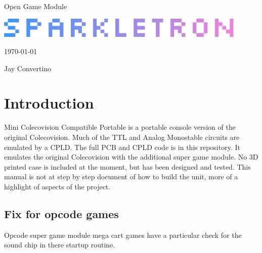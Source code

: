 \begin{titlepage}
  \begin{center}

  {\Huge Open Game Module}

  \vspace{25mm}

  \includegraphics[width=0.90\textwidth,height=\textheight,keepaspectratio]{img/SPARKLETRON.png}

  \vspace{25mm}

  \today

  \vspace{15mm}

  {\Large Jay Convertino}

  \end{center}
\end{titlepage}

\tableofcontents

\newpage

\section{Introduction}

\par
Mini Colecovision Compatible Portable is a portable console version of the original Colecovision. Much of the TTL and Analog Monostable circuits
are emulated by a CPLD. The full PCB and CPLD code is in this repository. It emulates the original Colecovision
with the additional super game module. No 3D printed case is included at the moment, but has been designed and tested. This
manual is not at step by step document of how to build the unit, more of a highlight of aspects of the project.

\subsection{Fix for opcode games}

Opcode super game module mega cart games have a particular check for the sound chip in there startup routine.

